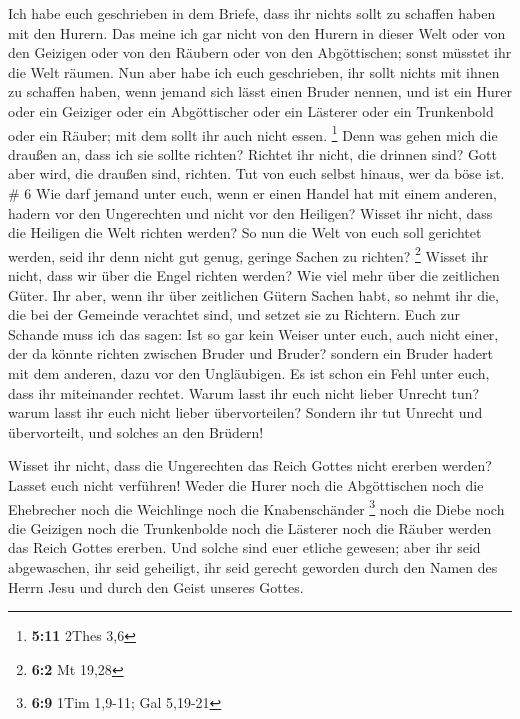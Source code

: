  Ich habe euch geschrieben in dem Briefe, dass ihr nichts
sollt zu schaffen haben mit den Hurern.  Das meine ich
gar nicht von den Hurern in dieser Welt oder von den Geizigen oder von
den Räubern oder von den Abgöttischen; sonst müsstet ihr die Welt
räumen.  Nun aber habe ich euch geschrieben, ihr sollt
nichts mit ihnen zu schaffen haben, wenn jemand sich lässt einen Bruder
nennen, und ist ein Hurer oder ein Geiziger oder ein Abgöttischer oder
ein Lästerer oder ein Trunkenbold oder ein Räuber; mit dem sollt ihr
auch nicht essen. \footnote{\textbf{5:11} 2Thes 3,6} 
Denn was gehen mich die draußen an, dass ich sie sollte richten? Richtet
ihr nicht, die drinnen sind?  Gott aber wird, die draußen
sind, richten. Tut von euch selbst hinaus, wer da böse ist. \# 6
 Wie darf jemand unter euch, wenn er einen Handel hat mit
einem anderen, hadern vor den Ungerechten und nicht vor den Heiligen?
 Wisset ihr nicht, dass die Heiligen die Welt richten
werden? So nun die Welt von euch soll gerichtet werden, seid ihr denn
nicht gut genug, geringe Sachen zu richten? \footnote{\textbf{6:2} Mt
  19,28}  Wisset ihr nicht, dass wir über die Engel
richten werden? Wie viel mehr über die zeitlichen Güter. 
Ihr aber, wenn ihr über zeitlichen Gütern Sachen habt, so nehmt ihr die,
die bei der Gemeinde verachtet sind, und setzet sie zu Richtern.
 Euch zur Schande muss ich das sagen: Ist so gar kein
Weiser unter euch, auch nicht einer, der da könnte richten zwischen
Bruder und Bruder?  sondern ein Bruder hadert mit dem
anderen, dazu vor den Ungläubigen.  Es ist schon ein Fehl
unter euch, dass ihr miteinander rechtet. Warum lasst ihr euch nicht
lieber Unrecht tun? warum lasst ihr euch nicht lieber übervorteilen?
 Sondern ihr tut Unrecht und übervorteilt, und solches an
den Brüdern!

 Wisset ihr nicht, dass die Ungerechten das Reich Gottes
nicht ererben werden? Lasset euch nicht verführen! Weder die Hurer noch
die Abgöttischen noch die Ehebrecher noch die Weichlinge noch die
Knabenschänder \footnote{\textbf{6:9} 1Tim 1,9-11; Gal 5,19-21}
 noch die Diebe noch die Geizigen noch die Trunkenbolde
noch die Lästerer noch die Räuber werden das Reich Gottes ererben.
 Und solche sind euer etliche gewesen; aber ihr seid
abgewaschen, ihr seid geheiligt, ihr seid gerecht geworden durch den
Namen des Herrn Jesu und durch den Geist unseres Gottes.

